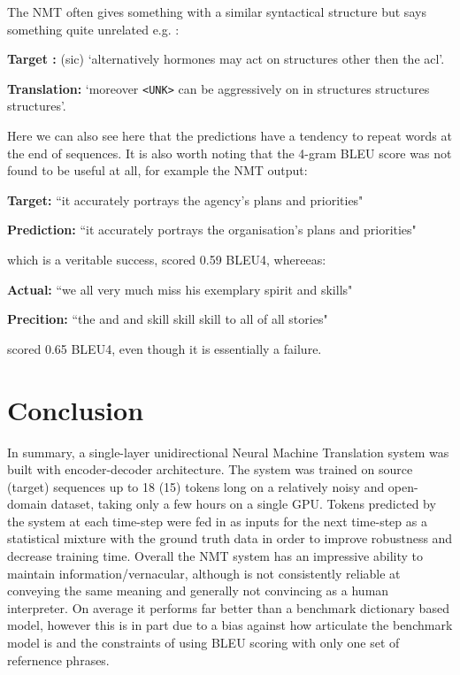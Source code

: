 \documentclass[]{article}
\begin{document}
The NMT often gives something with a similar syntactical structure but says something quite unrelated e.g. :
\begin{center}
	\textbf{Target :} (sic) `alternatively hormones may act on structures other then the acl'.
	
	\textbf{Translation:} `moreover \lstinline{<UNK>} can be aggressively on in structures structures structures'.
\end{center}
Here we can also see here that the predictions have a tendency to repeat words at the end of sequences. It is also worth noting that the 4-gram BLEU score was not found to be useful at all, for example the NMT output: 
\begin{center}
	\textbf{Target:} ``it accurately portrays the agency's plans and priorities"

\textbf{Prediction:} ``it accurately portrays the organisation's plans and priorities"
\end{center}
which is a veritable success, scored 0.59 BLEU4, whereeas:
\begin{center}
	\textbf{Actual:} ``we all very much miss his exemplary spirit and skills"

\textbf{Precition:} ``the and and skill skill skill to all of all stories"
\end{center}
scored 0.65 BLEU4, even though it is essentially a failure.
\section{Conclusion}
In summary, a single-layer unidirectional Neural Machine Translation system was built with encoder-decoder architecture. The system was trained on source (target) sequences up to 18 (15) tokens long on a relatively noisy and open-domain dataset, taking only a few hours on a single GPU. Tokens predicted by the system at each time-step were fed in as inputs for the next time-step as a statistical mixture with the ground truth data in order to improve robustness and decrease training time.
Overall the NMT system has an impressive ability to maintain information/vernacular, although is not consistently reliable at conveying the same meaning and generally not convincing as a human interpreter. On average it performs far better than a benchmark dictionary based model, however this is in part due to a bias against how articulate the benchmark model is and the constraints of using BLEU scoring with only one set of refernence phrases.
\end{document}
